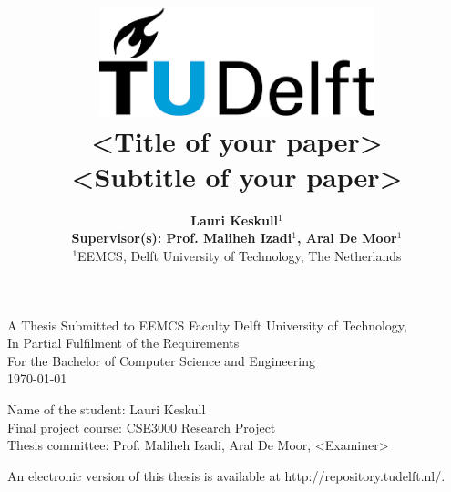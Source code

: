 \title{
    \includegraphics[width=8cm, keepaspectratio]{tudelftlogo.png}\\
    \vspace*{2cm}
    \textbf{
        \textless Title of your paper\textgreater\\
        {\large \textless Subtitle of your paper\textgreater}
    }\\
    \vspace*{1cm}
}

\author{
    \textbf{Lauri Keskull$^1$}\\
    \hfill \break
    \textbf{Supervisor(s):  Prof. Maliheh Izadi$^1$, Aral De Moor$^1$ }\\
    \break
    {\large 
        \hfill \break
        $^1$EEMCS, Delft University of Technology, The Netherlands
    }\\
}

\date{}

\maketitle
\thispagestyle{empty}

\let\clearpagebackup\clearpage
\renewcommand{\clearpage}{ }

\onecolumn

\vspace*{1.5cm}
\begin{center}
    A Thesis Submitted to EEMCS Faculty Delft University of Technology,\\
    In Partial Fulfilment of the Requirements\\
    For the Bachelor of Computer Science and Engineering\\
    \today
\end{center}

\vspace*{2cm}

\noindent
{\small
Name of the student: Lauri Keskull\\
Final project course: CSE3000 Research Project\\
Thesis committee: Prof. Maliheh Izadi, Aral De Moor, \textless Examiner\textgreater\\
}
\vfill

\begin{center}
    An electronic version of this thesis is available at http://repository.tudelft.nl/.
\end{center}

\twocolumn
\let\clearpage\clearpagebackup  
\clearpage
\setcounter{page}{1}
